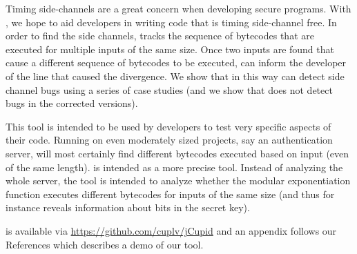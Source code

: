 Timing side-channels are a great concern when developing 
secure programs. With \jcupid, we hope to aid developers in writing
code that is timing side-channel free. In order to find the side
channels, \jcupid 
tracks the sequence of bytecodes that are executed for multiple inputs
of the same size. Once two inputs are found that cause a different
sequence of bytecodes to be executed, \jcupid can inform the developer
of the line that caused the
divergence. We show that in this way \jcupid can detect side channel
bugs using a series of case studies (and we show that \jcupid does not
detect bugs in the corrected versions).

This tool is intended to be used by developers to test very
specific aspects of their code. Running \jcupid on even moderately sized
projects, say an authentication server, will most
certainly find different bytecodes executed based on input (even of
the same length). \jcupid is intended as a more precise tool. Instead of 
analyzing the whole server, the tool is
intended to analyze whether the modular exponentiation function
executes different bytecodes for inputs of the same size (and thus for
instance reveals information about bits in the secret key). 

\jcupid is available via \url{https://github.com/cuplv/jCupid} and an appendix follows our References which describes a demo of our tool. 

